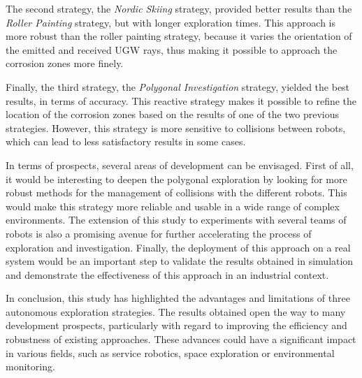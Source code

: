 \documentclass[english,RandD]{rapportPFE}  %
\begin{document}
		The second strategy, the \textit{Nordic Skiing} strategy, provided better results than the \textit{Roller Painting} strategy, but with longer exploration times.
		This approach is more robust than the roller painting strategy, because it varies the orientation of the emitted and received UGW rays, thus making it possible to approach the corrosion zones more finely.

		Finally, the third strategy, the \textit{Polygonal Investigation} strategy, yielded the best results, in terms of accuracy.
		This reactive strategy makes it possible to refine the location of the corrosion zones based on the results of one of the two previous strategies.
		However, this strategy is more sensitive to collisions between robots, which can lead to less satisfactory results in some cases.

		In terms of prospects, several areas of development can be envisaged.
		First of all, it would be interesting to deepen the polygonal exploration by looking for more robust methods for the management of collisions with the different robots.
		This would make this strategy more reliable and usable in a wide range of complex environments.
		The extension of this study to experiments with several teams of robots is also a promising avenue for further accelerating the process of exploration and investigation.
		Finally, the deployment of this approach on a real system would be an important step to validate the results obtained in simulation and demonstrate the effectiveness of this approach in an industrial context.

		In conclusion, this study has highlighted the advantages and limitations of three autonomous exploration strategies. The results obtained open the way to many development prospects, particularly with regard to improving the efficiency and robustness of existing approaches. These advances could have a significant impact in various fields, such as service robotics, space exploration or environmental monitoring.
	
	
	\appendix
\end{document}
